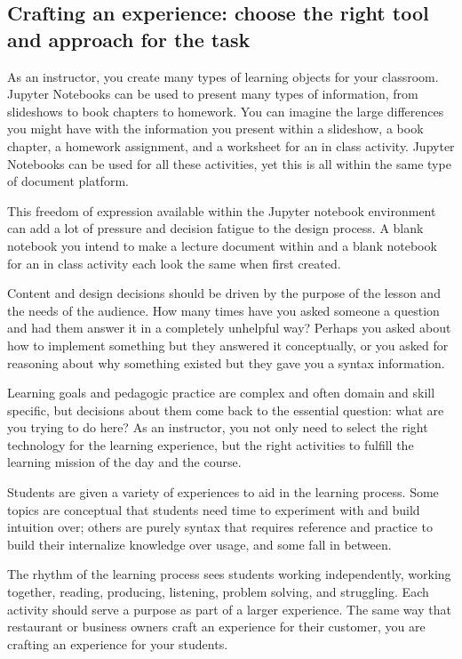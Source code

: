\documentclass[]{book}
\begin{document}
\subsection{Crafting an experience: choose the right tool and approach
for the
task}\label{crafting-an-experience-choose-the-right-tool-and-approach-for-the-task}

As an instructor, you create many types of learning objects for your
classroom. Jupyter Notebooks can be used to present many types of
information, from slideshows to book chapters to homework. You can
imagine the large differences you might have with the information you
present within a slideshow, a book chapter, a homework assignment, and a
worksheet for an in class activity. Jupyter Notebooks can be used for
all these activities, yet this is all within the same type of document
platform.

This freedom of expression available within the Jupyter notebook
environment can add a lot of pressure and decision fatigue to the design
process. A blank notebook you intend to make a lecture document within
and a blank notebook for an in class activity each look the same when
first created.

Content and design decisions should be driven by the purpose of the
lesson and the needs of the audience. How many times have you asked
someone a question and had them answer it in a completely unhelpful way?
Perhaps you asked about how to implement something but they answered it
conceptually, or you asked for reasoning about why something existed but
they gave you a syntax information.

Learning goals and pedagogic practice are complex and often domain and
skill specific, but decisions about them come back to the essential
question: what are you trying to do here? As an instructor, you not only
need to select the right technology for the learning experience, but the
right activities to fulfill the learning mission of the day and the
course.

Students are given a variety of experiences to aid in the learning
process. Some topics are conceptual that students need time to
experiment with and build intuition over; others are purely syntax that
requires reference and practice to build their internalize knowledge
over usage, and some fall in between.

The rhythm of the learning process sees students working independently,
working together, reading, producing, listening, problem solving, and
struggling. Each activity should serve a purpose as part of a larger
experience. The same way that restaurant or business owners craft an
experience for their customer, you are crafting an experience for your
students.
\end{document}
